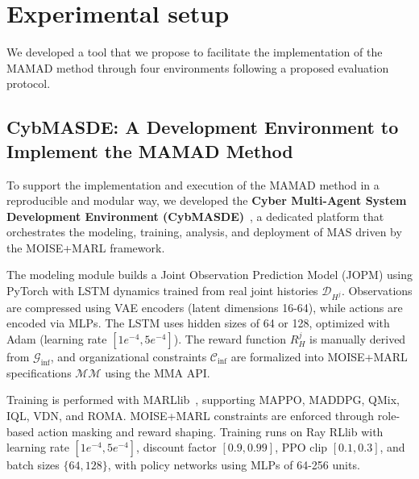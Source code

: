 \documentclass[pdflatex,sn-mathphys-num]{sn-jnl}%
\theoremstyle{thmstyleone}%
\theoremstyle{thmstyletwo}%
\theoremstyle{thmstylethree}%
\begin{document}
\section{Experimental setup}
\label{sec:experimental_setup}

We developed a tool that we propose to facilitate the implementation of the MAMAD method through four environments following a proposed evaluation protocol.

\subsection{CybMASDE: A Development Environment to Implement the MAMAD Method}
\label{sec:cybmasde}

To support the implementation and execution of the MAMAD method in a reproducible and modular way, we developed the \textbf{Cyber Multi-Agent System Development Environment (CybMASDE)}~\footnotemark[1], a dedicated platform that orchestrates the modeling, training, analysis, and deployment of MAS driven by the MOISE+MARL framework.



The modeling module builds a Joint Observation Prediction Model (JOPM) using PyTorch with LSTM dynamics trained from real joint histories $\mathcal{D}_{H^j}$. Observations are compressed using VAE encoders (latent dimensions 16-64), while actions are encoded via MLPs. The LSTM uses hidden sizes of 64 or 128, optimized with Adam (learning rate $[1e^{-4}, 5e^{-4}]$). The reward function $R^j_H$ is manually derived from $\mathcal{G}_{\text{inf}}$, and organizational constraints $\mathcal{C}_{\text{inf}}$ are formalized into MOISE+MARL specifications $\mathcal{MM}$ using the MMA API.

Training is performed with MARLlib~\cite{hu2022marllib}, supporting MAPPO, MADDPG, QMix, IQL, VDN, and ROMA. MOISE+MARL constraints are enforced through role-based action masking and reward shaping. Training runs on Ray RLlib with learning rate $[1e^{-4}, 5e^{-4}]$, discount factor $[0.9, 0.99]$, PPO clip $[0.1, 0.3]$, and batch sizes $\{64, 128\}$, with policy networks using MLPs of 64-256 units.
\end{document}
